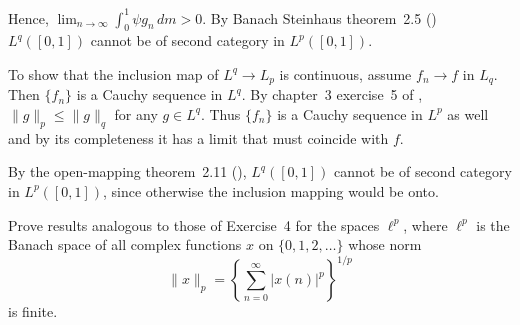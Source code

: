 \begin{enumerate}
\begin{itemize}
  Hence,
  \(\lim_{n\to\infty} \int_0^1 \psi g_n\,dm > 0\).
  By Banach Steinhaus
  theorem~2.5 (\cite{RudinFA79}) \(L^q([0,1])\) cannot be of second category
  in \(L^p([0,1])\).

  To show that the inclusion map of \(L^q\to L_p\) is continuous, assume
  \(f_n\to f\) in \(L_q\).
  Then \(\{f_n\}\) is a Cauchy sequence in \(L^q\).
  By chapter~3 exercise~5 of \cite{RudinRCA80},
  \(\|g\|_p \leq \|g\|_q\) for any \(g\in L^q\).
  Thus \(\{f_n\}\) is a Cauchy sequence in \(L^p\) as well
  and by its completeness it has a limit that must coincide with $f$.

  By the open-mapping theorem~2.11 (\cite{RudinFA79}), 
  \(L^q([0,1])\) cannot be of second category
  in \(L^p([0,1])\), since otherwise the inclusion mapping would be onto.
\end{itemize}


\begin{excopy}
Prove results analogous to those of Exercise~4 for the spaces \(\ell^p\),
where \(\ell^p\) is the Banach space of all
complex functions $x$ on \(\{0,1,2,\ldots\}\) whose norm 
\begin{equation*}
\|x\|_p = \left\{ \sum_{n=0}^\infty |x(n)|^p\right\}^{1/p}
\end{equation*}
is finite.
\end{excopy}


\end{enumerate}
